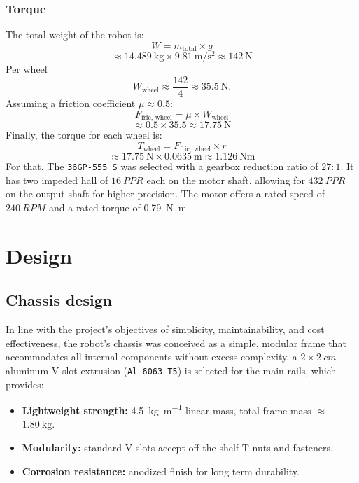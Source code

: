 \subsection{Torque}

The total weight of the robot is:
\begin{equation}
  W = m_{\text{total}} \times g
\end{equation}
\[\approx 14.489\ \mathrm{kg} \times 9.81\ \mathrm{m/s^2} \approx 142\ \mathrm{N}
\]
Per wheel
\[
  W_{\text{wheel}} \approx \frac{142}{4} \approx 35.5\ \mathrm{N}.
\]
Assuming a friction coefficient \( \mu \approx 0.5 \):
\begin{equation}
  F_{\text{fric, wheel}} = \mu \times W_{\text{wheel}}
\end{equation}
\[\approx 0.5 \times 35.5 \approx 17.75\ \mathrm{N}
\]
Finally, the torque for each wheel is:
\begin{equation}
  T_{\text{wheel}} = F_{\text{fric, wheel}} \times r
\end{equation}
\[
  \approx 17.75\ \mathrm{N} \times 0.0635\ \mathrm{m} \approx 1.126\ \mathrm{N m}
\]
For that, The \texttt{36GP-555 S} was selected with a gearbox reduction ratio of $27:1$. It has two impeded \gls{hall} of $16~PPR$ each on the motor shaft, allowing for $432~PPR$ on the output shaft for higher precision.
The motor offers a rated speed of $240~RPM$ and a rated torque of \SI{0.79}{\newton\meter}.

\chapter{Design}\label{design}

\section{Chassis design}

In line with the project's objectives of simplicity, maintainability, and cost effectiveness, the robot's chassis was conceived as a simple, modular frame that accommodates all internal components without excess complexity. a \(2\times2~cm\) aluminum V-slot extrusion (\texttt{Al 6063-T5}) is selected for the main rails, which provides:

\begin{itemize}

  \item \textbf{Lightweight strength:} \SI[per-mode=symbol]{4.5}{\kilogram\per\metre} linear mass, total frame mass \(\approx\)~\(\SI{1.80}{\kilogram}\).
  \item \textbf{Modularity:} standard V-slots accept off-the-shelf T-nuts and fasteners.
  \item \textbf{Corrosion resistance:} anodized finish for long term durability.

\end{itemize}

